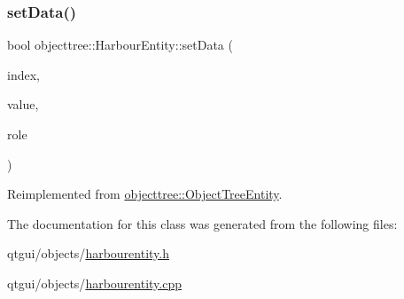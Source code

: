 \subsubsection{\texorpdfstring{setData()}{setData()}}
{\footnotesize\ttfamily bool objecttree\+::\+Harbour\+Entity\+::set\+Data (\begin{DoxyParamCaption}\item[{const Q\+Model\+Index \&}]{index,  }\item[{const Q\+Variant \&}]{value,  }\item[{int}]{role }\end{DoxyParamCaption})\hspace{0.3cm}{\ttfamily [virtual]}}



Reimplemented from \mbox{\hyperlink{classobjecttree_1_1_object_tree_entity_ab6742194e637093cb1571998bee88ff5}{objecttree\+::\+Object\+Tree\+Entity}}.



The documentation for this class was generated from the following files\+:\begin{DoxyCompactItemize}
\item 
qtgui/objects/\mbox{\hyperlink{harbourentity_8h}{harbourentity.\+h}}\item 
qtgui/objects/\mbox{\hyperlink{harbourentity_8cpp}{harbourentity.\+cpp}}\end{DoxyCompactItemize}
